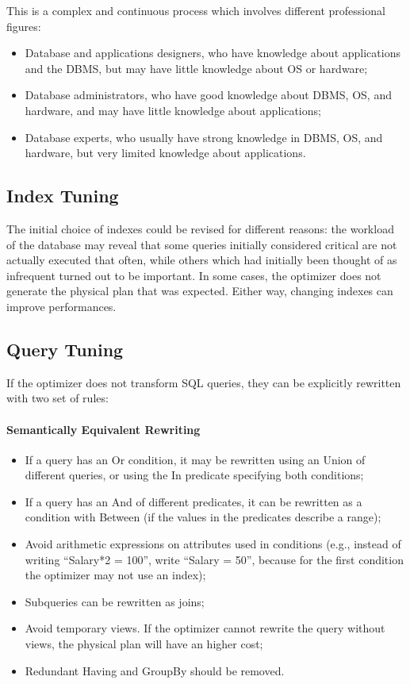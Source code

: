 This is a complex and continuous process which involves different professional figures:
\begin{itemize}
    \item Database and applications designers, who have knowledge about applications and the DBMS, but may have little knowledge about OS or hardware;
    \item Database administrators, who have good knowledge about DBMS, OS, and hardware, and may have little knowledge about applications;
    \item Database experts, who usually have strong knowledge in DBMS, OS, and hardware, but very limited knowledge about applications.
\end{itemize}

\subsection{Index Tuning}

The initial choice of indexes could be revised for different reasons: the workload of the database may reveal that some queries initially considered critical are not actually executed that often, while others which had initially been thought of as infrequent turned out to be important. In some cases, the optimizer does not generate the physical plan that was expected. Either way, changing indexes can improve performances.

\subsection{Query Tuning}

If the optimizer does not transform SQL queries, they can be explicitly rewritten with two set of rules:
\paragraph{Semantically Equivalent Rewriting}
\begin{itemize}
    \item If a query has an Or condition, it may be rewritten using an Union of different queries, or using the In predicate specifying both conditions;

    \item If a query has an And of different predicates, it can be rewritten as a condition with Between (if the values in the predicates describe a range);

    \item Avoid arithmetic expressions on attributes used in conditions (e.g., instead of writing ``Salary*2 = 100'', write ``Salary = 50'', because for the first condition the optimizer may not use an index);

    \item Subqueries can be rewritten as joins;

    \item Avoid temporary views. If the optimizer cannot rewrite the query without views, the physical plan will have an higher cost;

    \item Redundant Having and GroupBy should be removed.
\end{itemize}

